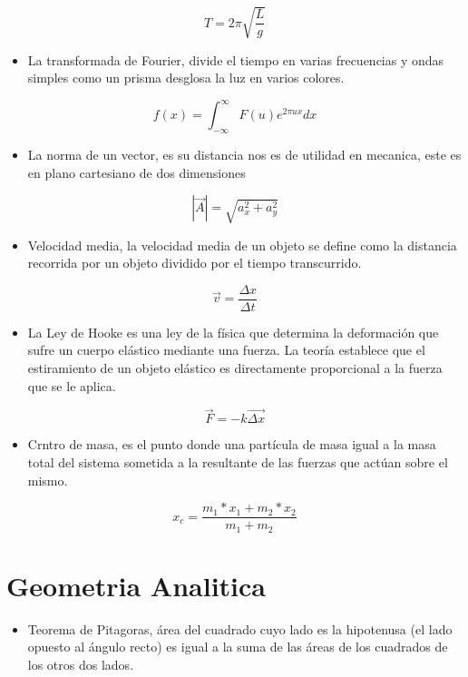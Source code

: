 \documentclass[12pt, letterpaper]{article}
\begin{document}
$$ T = 2\pi \sqrt{\frac{L}{g}} $$

\begin{itemize}
    \item[\spadesuit] La transformada de Fourier, divide el tiempo en varias frecuencias y ondas simples como un prisma desglosa la luz en varios colores.
\end{itemize}

$$ f(x) = \int_{-\infty}^{\infty} F(u) e^{2\pi ux} dx$$

\begin{itemize}
    \item [\star] La norma de un vector, es su distancia nos es de utilidad en mecanica, este es en plano cartesiano de dos dimensiones 
\end{itemize}
    $$ |\vec{A}| = \sqrt{a_{x}^{2} + a_{y}^{2}} $$
\begin{itemize}
    \item [\bigstar] Velocidad media, la velocidad media de un objeto se define como la distancia recorrida por un objeto dividido por el tiempo transcurrido.
\end{itemize}

    $$ \vec{v} = \frac{\Delta x}{\Delta t}$$
\begin{itemize}
    \item[\textsection]La Ley de Hooke es una ley de la física que determina la deformación que sufre un cuerpo elástico mediante una fuerza. La teoría establece que el estiramiento de un objeto elástico es directamente proporcional a la fuerza que se le aplica. 
\end{itemize}
    $$\vec{F}=-k\vec{\Delta x}$$
\begin{itemize}
    \item[\clubsuit] Crntro de masa, es el punto donde una partícula de masa igual a la masa total del sistema sometida a la resultante de las fuerzas que actúan sobre el mismo.
\end{itemize}
    $$ x_c = \frac{m_1 * x_1 + m_2 * x_2 }{ m_1 + m_2}$$
\section{Geometria Analitica}
\begin{itemize}
    \item [\star] Teorema de Pitagoras, área del cuadrado cuyo lado es la hipotenusa (el lado opuesto al ángulo recto) es igual a la suma de las áreas de los cuadrados de los otros dos lados.
\end{itemize}
\end{document}
